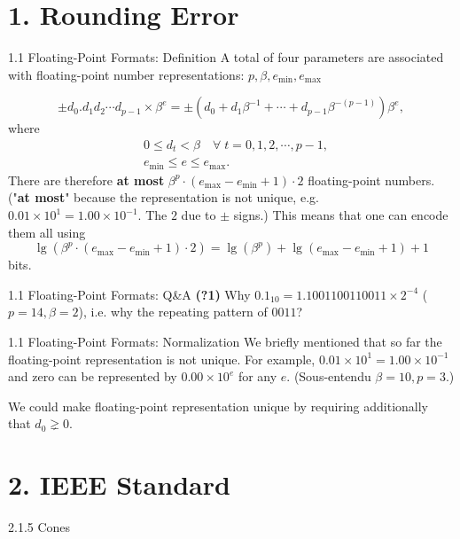 \documentclass{beamer}
\begin{document}
\section{1. Rounding Error}
\begin{frame}{1.1 Floating-Point Formats: Definition}
  A total of four parameters are associated with floating-point number representations:
  $p, \beta, e_{\text{min}}, e_{\text{max}}$

  $$
    \pm d_{0}.d_{1}d_{2} \cdots d_{p-1} \times \beta^{e} = \pm\left( d_{0} + d_{1}\beta^{-1} + \cdots + d_{p-1}\beta^{-(p-1)} \right) \beta^{e},
  $$
  where
  $$
  \begin{aligned}
    & 0 \le d_{t} < \beta \quad\forall\; t = 0, 1, 2, \cdots, p-1, \\
    & e_{\text{min}} \le e \le e_{\text{max}}.
  \end{aligned}
  $$
  There are therefore \textbf{at most} $\beta^{p} \cdot (e_{\text{max}} - e_{\text{min}} + 1) \cdot 2$ floating-point numbers.
  ("\textbf{at most}" because the representation is not unique, e.g. $0.01 \times 10^{1} = 1.00 \times 10^{-1}.$
  The $2$ due to $\pm$ signs.)
  This means that one can encode them all using
  $$
    \lg\left( {\beta^{p} \cdot (e_{\text{max}} - e_{\text{min}} + 1) \cdot 2} \right) =
    \lg(\beta^{p}) + \lg( e_{\text{max}} - e_{\text{min}} + 1) + 1
  $$
  bits.

\end{frame}


\begin{frame}{1.1 Floating-Point Formats: Q\&A}
  \textbf{(?1)} Why $0.1_{10} = 1.1001100110011 \times 2^{-4}$ ($p=14, \beta=2$), i.e. why the repeating pattern of $0011$?

  \vspace{7pt}
\end{frame}


\begin{frame}{1.1 Floating-Point Formats: Normalization}
  We briefly mentioned that so far the floating-point representation is not unique.
  For example, $0.01 \times 10^{1} = 1.00 \times 10^{-1}$ and zero can be represented
  by $0.00 \times 10^{e}$ for any $e.$ (Sous-entendu $\beta = 10, p = 3.$)

  We could make floating-point representation unique by requiring additionally that $d_{0} \gneq 0.$
\end{frame}


\section{2. IEEE Standard}
\begin{frame}{2.1.5 Cones}
\end{frame}
\end{document}
